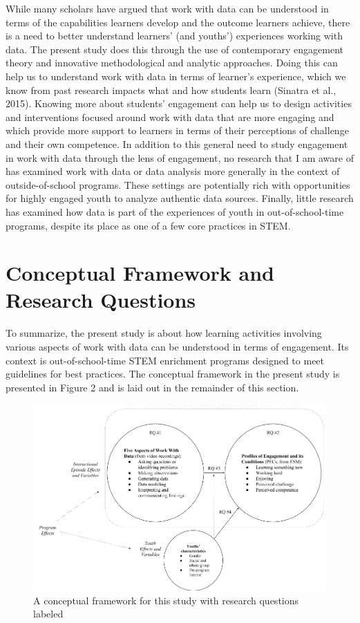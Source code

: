 \documentclass[]{book}
\theoremstyle{definition}
\theoremstyle{definition}
\theoremstyle{definition}
\theoremstyle{remark}
\begin{document}
While many scholars have argued that work with data can be understood in
terms of the capabilities learners develop and the outcome learners
achieve, there is a need to better understand learners' (and youths')
experiences working with data. The present study does this through the
use of contemporary engagement theory and innovative methodological and
analytic approaches. Doing this can help us to understand work with data
in terms of learner's experience, which we know from past research
impacts what and how students learn (Sinatra et al., 2015). Knowing more
about students' engagement can help us to design activities and
interventions focused around work with data that are more engaging and
which provide more support to learners in terms of their perceptions of
challenge and their own competence. In addition to this general need to
study engagement in work with data through the lens of engagement, no
research that I am aware of has examined work with data or data analysis
more generally in the context of outside-of-school programs. These
settings are potentially rich with opportunities for highly engaged
youth to analyze authentic data sources. Finally, little research has
examined how data is part of the experiences of youth in
out-of-school-time programs, despite its place as one of a few core
practices in STEM.

\section{Conceptual Framework and Research
Questions}\label{conceptual-framework-and-research-questions}

To summarize, the present study is about how learning activities
involving various aspects of work with data can be understood in terms
of engagement. Its context is out-of-school-time STEM enrichment
programs designed to meet guidelines for best practices. The conceptual
framework in the present study is presented in Figure 2 and is laid out
in the remainder of this section.

\begin{figure}

{\centering \includegraphics[width=0.8\linewidth]{images/figure2} 

}

\caption{A conceptual framework for this study with research questions labeled}\label{fig:unnamed-chunk-2}
\end{figure}
\end{document}

